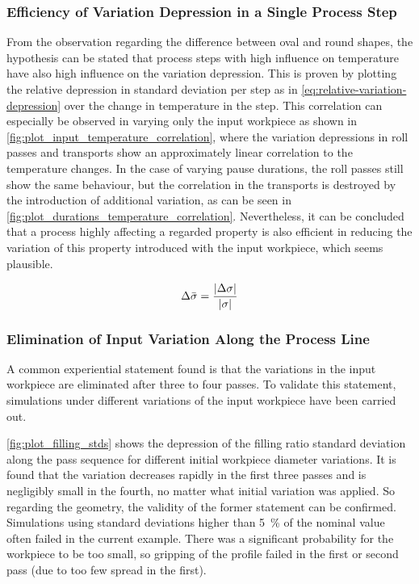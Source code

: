 \subsubsection{Efficiency of Variation Depression in a Single Process Step}

From the observation regarding the difference between oval and round shapes, the hypothesis can be stated that process steps with high influence on temperature have also high influence on the variation depression.
This is proven by plotting the relative depression in standard deviation per step as in \autoref{eq:relative-variation-depression} over the change in temperature in the step.
This correlation can especially be observed in varying only the input workpiece as shown in \autoref{fig:plot_input_temperature_correlation}, where the variation depressions in roll passes and transports show an approximately linear correlation to the temperature changes.
In the case of varying pause durations, the roll passes still show the same behaviour, but the correlation in the transports is destroyed by the introduction of additional variation, as can be seen in \autoref{fig:plot_durations_temperature_correlation}.
Nevertheless, it can be concluded that a process highly affecting a regarded property is also efficient in reducing the variation of this property introduced with the input workpiece, which seems plausible.

\begin{equation}
    {\Delta\bar{\sigma}} = \frac{{\lvert {\Delta {\sigma}} \rvert}}{{\lvert {\sigma} \rvert}}
    \label{eq:relative-variation-depression}
\end{equation}


\subsubsection{Elimination of Input Variation Along the Process Line}

A common experiential statement found is that the variations in the input workpiece are eliminated after three to four passes.
To validate this statement, simulations under different variations of the input workpiece have been carried out.

\autoref{fig:plot_filling_stds} shows the depression of the filling ratio standard deviation along the pass sequence for different initial workpiece diameter variations.
It is found that the variation decreases rapidly in the first three passes and is negligibly small in the fourth, no matter what initial variation was applied.
So regarding the geometry, the validity of the former statement can be confirmed.
Simulations using standard deviations higher than \qty{5}{\percent} of the nominal value often failed in the current example.
There was a significant probability for the workpiece to be too small, so gripping of the profile failed in the first or second pass (due to too few spread in the first).

